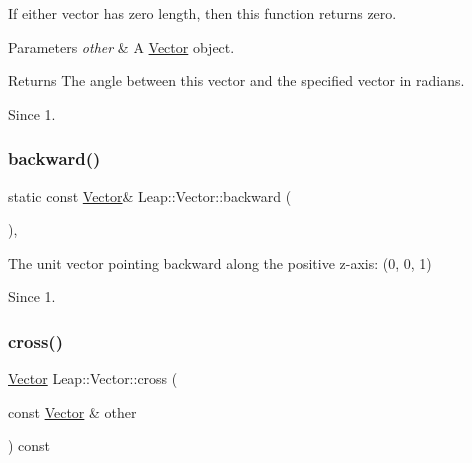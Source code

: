 If either vector has zero length, then this function returns zero.




\begin{DoxyCodeInclude}
\end{DoxyCodeInclude}



\begin{DoxyParams}{Parameters}
{\em other} & A \hyperlink{struct_leap_1_1_vector}{Vector} object. \\
\hline
\end{DoxyParams}
\begin{DoxyReturn}{Returns}
The angle between this vector and the specified vector in radians. 
\end{DoxyReturn}
\begin{DoxySince}{Since}
1. 
\end{DoxySince}
\mbox{\label{struct_leap_1_1_vector_a82ea3abc8ae6bb144a5946836fce88ad}} 
\subsubsection{\texorpdfstring{backward()}{backward()}}
{\footnotesize\ttfamily static const \hyperlink{struct_leap_1_1_vector}{Vector}\& Leap\+::\+Vector\+::backward (\begin{DoxyParamCaption}{ }\end{DoxyParamCaption})\hspace{0.3cm}{\ttfamily [inline]}, {\ttfamily [static]}}

The unit vector pointing backward along the positive z-\/axis\+: (0, 0, 1)


\begin{DoxyCodeInclude}
\end{DoxyCodeInclude}
 \begin{DoxySince}{Since}
1. 
\end{DoxySince}
\mbox{\label{struct_leap_1_1_vector_a2104b0be8307d670308b7807cd5d440a}} 
\subsubsection{\texorpdfstring{cross()}{cross()}}
{\footnotesize\ttfamily \hyperlink{struct_leap_1_1_vector}{Vector} Leap\+::\+Vector\+::cross (\begin{DoxyParamCaption}\item[{const \hyperlink{struct_leap_1_1_vector}{Vector} \&}]{other }\end{DoxyParamCaption}) const\hspace{0.3cm}{\ttfamily [inline]}}

